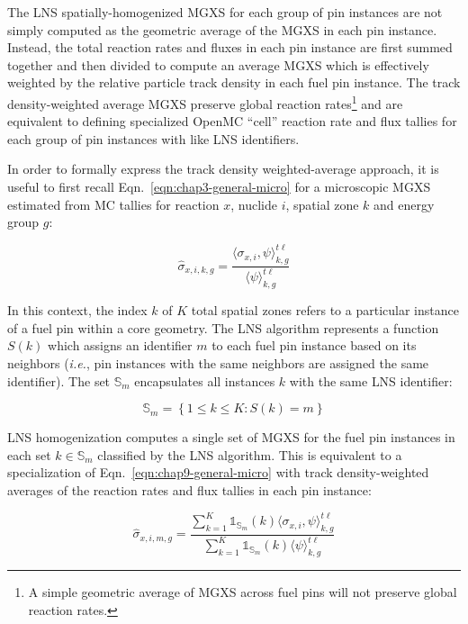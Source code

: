 The \ac{LNS} spatially-homogenized \ac{MGXS} for each group of pin instances are not simply computed as the geometric average of the \ac{MGXS} in each pin instance. Instead, the total reaction rates and fluxes in each pin instance are first summed together and then divided to compute an average \ac{MGXS} which is effectively weighted by the relative particle track density in each fuel pin instance. The track density-weighted average \ac{MGXS} preserve global reaction rates\footnote{A simple geometric average of \ac{MGXS} across fuel pins will not preserve global reaction rates.} and are equivalent to defining specialized OpenMC ``cell'' reaction rate and flux tallies for each group of pin instances with like \ac{LNS} identifiers. 

In order to formally express the track density weighted-average approach, it is useful to first recall Eqn.~\ref{eqn:chap3-general-micro} for a microscopic \ac{MGXS} estimated from \ac{MC} tallies for reaction $x$, nuclide $i$, spatial zone $k$ and energy group $g$:

\begin{equation}
\label{eqn:chap9-general-micro}
\hat{\sigma}_{x,i,k,g} = \frac{\langle \sigma_{x,i}, \psi \rangle_{k,g}^{t\ell}}{\langle \psi \rangle_{k,g}^{t\ell}}
\end{equation}

\noindent In this context, the index $k$ of $K$ total spatial zones refers to a particular instance of a fuel pin within a core geometry. The \ac{LNS} algorithm represents a function $S(k)$ which assigns an identifier $m$ to each fuel pin instance based on its neighbors (\textit{i.e.}, pin instances with the same neighbors are assigned the same identifier). The set $\mathbb{S}_{m}$ encapsulates all instances $k$  with the same \ac{LNS} identifier:

\begin{equation}
\label{eqn:chap9-lns-set}
\mathbb{S}_{m} = \left\{1 \le k \le K: S(k) = m\right\}
\end{equation}

\ac{LNS} homogenization computes a single set of \ac{MGXS} for the fuel pin instances in each set $k \in \mathbb{S}_{m}$ classified by the \ac{LNS} algorithm. This is equivalent to a specialization of Eqn.~\ref{eqn:chap9-general-micro} with track density-weighted averages of the reaction rates and flux tallies in each pin instance:

\begin{equation}
\label{eqn:chap9-lns-micro}
\hat{\sigma}_{x,i,m,g} = \frac{\displaystyle\sum\limits_{k=1}^{K}\mathbb{1}_{\mathbb{S}_{m}}(k) \langle \sigma_{x,i}, \psi \rangle_{k,g}^{t\ell}}{\displaystyle\sum\limits_{k=1}^{K}\mathbb{1}_{\mathbb{S}_{m}}(k) \langle \psi \rangle_{k,g}^{t\ell}}
\end{equation}

